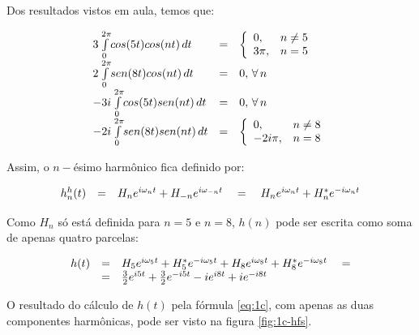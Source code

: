 Dos resultados vistos em aula, temos que:

\[\displaystyle
\begin{array}{l c l}

3 \int\limits_0^{2\pi} \! cos(5t)cos(nt) \, dt & = & \left\{
\begin{array}{l l} 
  0, & n \neq 5 \\ 
  3\pi, & n = 5  \\
\end{array} \right. \\

2 \int\limits_0^{2\pi} \! sen(8t)cos(nt) \, dt & = & 0, \, \forall \, n\\
 
-3i \int\limits_0^{2\pi} \! cos(5t)sen(nt) \, dt & = & 0, \, \forall \, n\\
 

-2i \int\limits_0^{2\pi} \! sen(8t)sen(nt) \, dt & = & \left\{
\begin{array}{l l} 
  0, & n \neq 8 \\
  -2i\pi, & n = 8
\end{array} \right.

\end{array}
\]

Assim, o $n-$ésimo harmônico fica definido por:

\[\displaystyle
\begin{array}{l c l}
  h_n^h(t) & = & H_n e^{i \omega_n t} + H_{-n} e^{i \omega_{-n} t} \quad = \quad H_n e^{i \omega_n t} + H_n^* e^{-i \omega_n t}
\end{array}
\]

Como $H_n$ só está definida para $n=5$ e $n=8$, $h(n)$ pode ser escrita como soma de apenas quatro parcelas:

\begin{equation}\displaystyle
\begin{array}{l c l}
  h(t) & = & H_5 e^{i \omega_5 t} + H_5^* e^{-i \omega_5 t} + H_8 e^{i \omega_8 t} + H_8^* e^{-i \omega_8 t} \quad = \\
       & = &  \frac{3}{2} e^{i5t} + \frac{3}{2} e^{-i5t} -i e^{i8t} +i e^{-i8t}
  \label{eq:1c}
\end{array}
\end{equation}

O resultado do cálculo de $h(t)$ pela fórmula \eqref{eq:1c}, com apenas as duas componentes harmônicas, pode ser visto na figura \ref{fig:1c-hfs}.

